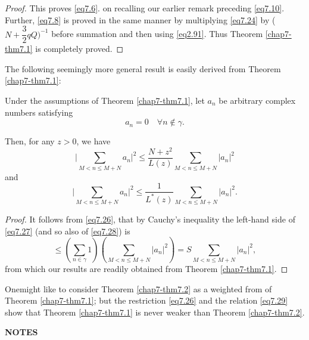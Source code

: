 \begin{proof}
This proves \eqref{eq7.6}. on recalling our earlier remark preceding
\eqref{eq7.10}. Further, \eqref{eq7.8} is proved in the same manner by
multiplying \eqref{eq7.24} by ($N + \dfrac{3}{2}q Q)^{-1}$ before
summation and then using \eqref{eq2.91}. Thus Theorem
\ref{chap7-thm7.1} is completely proved. 
\end{proof}

The following seemingly more general result is easily derived from
Theorem \ref{chap7-thm7.1}: 

\begin{theorem}\label{chap7-thm7.2}%
Under the assumptions of Theorem \ref{chap7-thm7.1}, let $a_n$ be
arbitrary complex numbers satisfying 
\begin{equation}
a_n=0 \quad \forall n \notin \gamma. \tag{7.26}\label{eq7.26}
\end{equation}
\end{theorem}

Then, for any $z >0$, we have 
\begin{equation}
\Big| \sum_{M < n \leq M+N} a_n \Big|^2 \leq \frac{N+z^2}{L(z)}
\sum_{M < n \leq M+N} |a_n|^2 \tag{7.27}\label{eq7.27} 
\end{equation}
and 
\begin{equation}
\Big| \sum_{M < n \leq M+N} a_n \Big|^2 \leq \frac{1}{L^*(z)}\sum_{M <
  n \leq M+N} |a_n|^2. \tag{7.28}\label{eq7.28} 
\end{equation}

\begin{proof}
It follows from \eqref{eq7.26}, that by Cauchy's inequality the
left-hand side of \eqref{eq7.27} (and so also of \eqref{eq7.28}) is  
\begin{equation}
\leq (\sum_{n \in \gamma} 1)(\sum_{M < n \leq M+N} |a_n|^2 ) = S
\sum_{M < n \leq M+N} |a_n|^2 , \tag{7.29}\label{eq7.29} 
\end{equation}
from which our results are readily obtained from Theorem \ref{chap7-thm7.1}.  
\end{proof}

\begin{remark*}
One\pageoriginale might like to consider Theorem \ref{chap7-thm7.2} as
a weighted from of Theorem \ref{chap7-thm7.1}; but the restriction
\eqref{eq7.26} and the relation 
\eqref{eq7.29} show that Theorem \ref{chap7-thm7.1} is never weaker
than Theorem \ref{chap7-thm7.2}.  
\end{remark*}

\medskip
\begin{center}
{\bf NOTES} 
\end{center}

